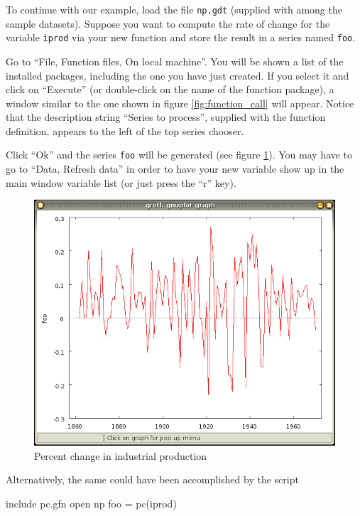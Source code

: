 To continue with our example, load the file \texttt{np.gdt} (supplied
with  among the sample datasets). Suppose you want to
compute the rate of change for the variable \texttt{iprod} via your
new function and store the result in a series named \texttt{foo}.

Go to ``File, Function files, On local machine''.  You will be shown a
list of the installed packages, including the one you have just
created. If you select it and click on ``Execute'' (or double-click on
the name of the function package), a window similar to the one shown
in figure \ref{fig:function_call} will appear.  Notice that the
description string ``Series to process'', supplied with the function
definition, appears to the left of the top series chooser.

Click ``Ok'' and the series \texttt{foo} will be generated (see figure
\ref{fig:iprod_pc}).  You may have to go to ``Data, Refresh data'' in
order to have your new variable show up in the main window variable
list (or just press the ``r'' key).

\begin{figure}[htbp]
  \centering
  \includegraphics[scale=0.5]{figures/iprod_pc}
  \caption{Percent change in industrial production}
  \label{fig:iprod_pc}
\end{figure}

Alternatively, the same could have been accomplished by the script
\begin{code}
include pc.gfn
open np
foo = pc(iprod)
\end{code}

